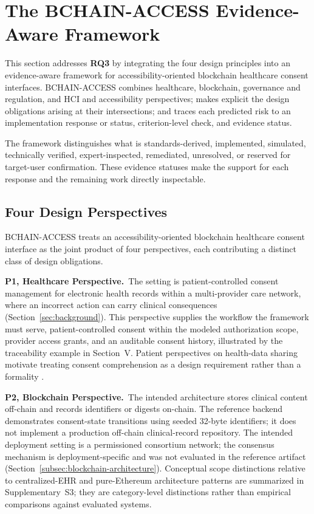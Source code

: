 \documentclass[journal]{IEEEtran}
\begin{document}
\section{The BCHAIN-ACCESS Evidence-Aware Framework}
\label{sec:framework}

This section addresses \textbf{RQ3} by integrating the four design principles into an evidence-aware framework for accessibility-oriented blockchain healthcare consent interfaces. BCHAIN-ACCESS combines healthcare, blockchain, governance and regulation, and HCI and accessibility perspectives; makes explicit the design obligations arising at their intersections; and traces each predicted risk to an implementation response or status, criterion-level check, and evidence status.

The framework distinguishes what is standards-derived, implemented, simulated, technically verified, expert-inspected, remediated, unresolved, or reserved for target-user confirmation. These evidence statuses make the support for each response and the remaining work directly inspectable.

\subsection{Four Design Perspectives}

BCHAIN-ACCESS treats an accessibility-oriented blockchain healthcare consent interface as the joint product of four perspectives, each contributing a distinct class of design obligations.

\noindent\textbf{P1, Healthcare Perspective.}\ The setting is patient-controlled
consent management for electronic health records within a multi-provider care
network, where an incorrect action can carry clinical consequences
(Section~\ref{sec:background}). This perspective supplies the workflow the framework
must serve, patient-controlled consent within the modeled authorization scope, provider access grants, and an auditable
consent history, illustrated by the traceability example in Section~V. Patient perspectives on health-data sharing motivate treating consent comprehension as a design requirement rather than a formality \cite{magsamen2019patient}.

\noindent\textbf{P2, Blockchain Perspective.}\ The intended architecture stores clinical content off-chain and records identifiers or digests on-chain. The reference backend demonstrates consent-state transitions using seeded 32-byte identifiers; it does not implement a production off-chain clinical-record repository. The intended deployment setting is a permissioned consortium network; the consensus mechanism is deployment-specific and was not evaluated in the reference artifact (Section~\ref{subsec:blockchain-architecture}). Conceptual scope distinctions relative to centralized-EHR and pure-Ethereum architecture patterns are summarized in Supplementary~S3; they are category-level distinctions rather than empirical comparisons against evaluated systems.
\end{document}
